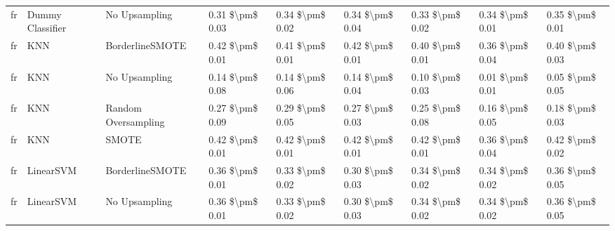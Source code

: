 \begin{tabular}{lllllllll}
      fr &                Dummy Classifier &                 No Upsampling & 0.31 \$\textbackslash pm\$ 0.03 &           0.34 \$\textbackslash pm\$ 0.02 &       0.34 \$\textbackslash pm\$ 0.04 &        0.33 \$\textbackslash pm\$ 0.02 &                         0.34 \$\textbackslash pm\$ 0.01 &     0.35 \$\textbackslash pm\$ 0.01 \\
      fr &                             KNN &               BorderlineSMOTE & 0.42 \$\textbackslash pm\$ 0.01 &           0.41 \$\textbackslash pm\$ 0.01 &       0.42 \$\textbackslash pm\$ 0.01 &        0.40 \$\textbackslash pm\$ 0.01 &                         0.36 \$\textbackslash pm\$ 0.04 &     0.40 \$\textbackslash pm\$ 0.03 \\
      fr &                             KNN &                 No Upsampling & 0.14 \$\textbackslash pm\$ 0.08 &           0.14 \$\textbackslash pm\$ 0.06 &       0.14 \$\textbackslash pm\$ 0.04 &        0.10 \$\textbackslash pm\$ 0.03 &                         0.01 \$\textbackslash pm\$ 0.01 &     0.05 \$\textbackslash pm\$ 0.05 \\
      fr &                             KNN &           Random Oversampling & 0.27 \$\textbackslash pm\$ 0.09 &           0.29 \$\textbackslash pm\$ 0.05 &       0.27 \$\textbackslash pm\$ 0.03 &        0.25 \$\textbackslash pm\$ 0.08 &                         0.16 \$\textbackslash pm\$ 0.05 &     0.18 \$\textbackslash pm\$ 0.03 \\
      fr &                             KNN &                         SMOTE & 0.42 \$\textbackslash pm\$ 0.01 &           0.42 \$\textbackslash pm\$ 0.01 &       0.42 \$\textbackslash pm\$ 0.01 &        0.42 \$\textbackslash pm\$ 0.01 &                         0.36 \$\textbackslash pm\$ 0.04 &     0.42 \$\textbackslash pm\$ 0.02 \\
      fr &                       LinearSVM &               BorderlineSMOTE & 0.36 \$\textbackslash pm\$ 0.01 &           0.33 \$\textbackslash pm\$ 0.02 &       0.30 \$\textbackslash pm\$ 0.03 &        0.34 \$\textbackslash pm\$ 0.02 &                         0.34 \$\textbackslash pm\$ 0.02 &     0.36 \$\textbackslash pm\$ 0.05 \\
      fr &                       LinearSVM &                 No Upsampling & 0.36 \$\textbackslash pm\$ 0.01 &           0.33 \$\textbackslash pm\$ 0.02 &       0.30 \$\textbackslash pm\$ 0.03 &        0.34 \$\textbackslash pm\$ 0.02 &                         0.34 \$\textbackslash pm\$ 0.02 &     0.36 \$\textbackslash pm\$ 0.05 \\

\end{tabular}

